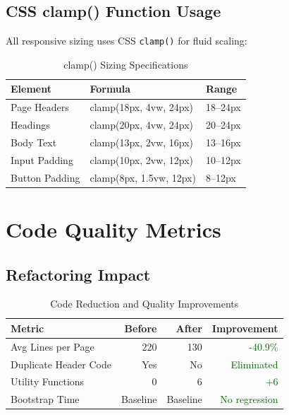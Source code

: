 \documentclass[11pt, a4paper]{report}
\begin{document}
\subsection{CSS clamp() Function Usage}

All responsive sizing uses CSS \texttt{clamp()} for fluid scaling:

\begin{table}[H]
    \centering
    \caption{clamp() Sizing Specifications}
    \begin{tabular}{|l|l|l|}
        \hline
        \textbf{Element} & \textbf{Formula} & \textbf{Range} \\
        \hline
        Page Headers & clamp(18px, 4vw, 24px) & 18–24px \\
        Headings & clamp(20px, 4vw, 24px) & 20–24px \\
        Body Text & clamp(13px, 2vw, 16px) & 13–16px \\
        Input Padding & clamp(10px, 2vw, 12px) & 10–12px \\
        Button Padding & clamp(8px, 1.5vw, 12px) & 8–12px \\
        \hline
    \end{tabular}
\end{table}

\section{Code Quality Metrics}

\subsection{Refactoring Impact}

\begin{table}[H]
    \centering
    \caption{Code Reduction and Quality Improvements}
    \begin{tabular}{|l|r|r|r|}
        \hline
        \textbf{Metric} & \textbf{Before} & \textbf{After} & \textbf{Improvement} \\
        \hline
        Avg Lines per Page & 220 & 130 & \textcolor{darkgreen}{-40.9\%} \\
        Duplicate Header Code & Yes & No & \textcolor{darkgreen}{Eliminated} \\
        Utility Functions & 0 & 6 & \textcolor{darkgreen}{+6} \\
        Bootstrap Time & Baseline & Baseline & \textcolor{darkgreen}{No regression} \\
        \hline
    \end{tabular}
\end{table}
\end{document}
